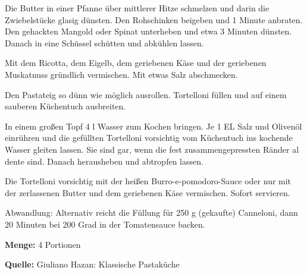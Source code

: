 {Die Butter in einer Pfanne über mittlerer Hitze schmelzen und darin die Zwiebelstücke glasig dünsten. Den Rohschinken beigeben und 1 Minute anbraten. Den gehackten Mangold oder Spinat unterheben und etwa 3 Minuten dünsten. Danach in eine Schüssel schütten und abkühlen lassen.

Mit dem Ricotta, dem Eigelb, dem geriebenen Käse und der geriebenen Muskatnuss gründlich vermischen. Mit etwas Salz abschmecken.

Den Pastateig so dünn wie möglich ausrollen. Tortelloni füllen und auf einem sauberen Küchentuch ausbreiten.

In einem großen Topf 4 l Wasser zum Kochen bringen. Je 1 EL Salz und Olivenöl einrühren und die gefüllten Tortelloni vorsichtig vom Küchentuch ins kochende Wasser gleiten lassen. Sie sind gar, wenn die fest zusammengepressten Ränder al dente sind. Danach herausheben und abtropfen lassen.

Die Tortelloni vorsichtig mit der heißen Burro-e-pomodoro-Sauce oder nur mit der zerlassenen Butter und dem geriebenen Käse vermischen. Sofort servieren.

Abwandlung: Alternativ reicht die Füllung für 250 g (gekaufte) Canneloni, dann 20 Minuten bei 200 Grad in der Tomatensauce backen.


{\bfseries Menge:} 4 Portionen

{\bfseries Quelle:} Giuliano Hazan: Klassische Pastaküche 

} 

